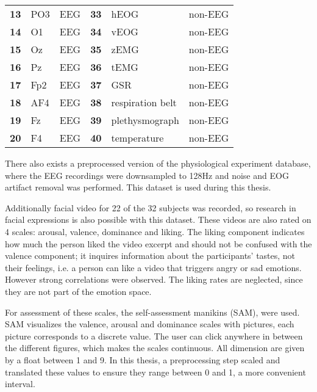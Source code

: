 \begin{table}[]
\begin{tabular}{l|ll|l|ll}
\textbf{13}      & PO3           & EEG               & \textbf{33}      & hEOG             & non-EEG           \\
\textbf{14}      & O1            & EEG               & \textbf{34}      & vEOG             & non-EEG           \\
\textbf{15}      & Oz            & EEG               & \textbf{35}      & zEMG             & non-EEG           \\
\textbf{16}      & Pz            & EEG               & \textbf{36}      & tEMG             & non-EEG           \\
\textbf{17}      & Fp2           & EEG               & \textbf{37}      & GSR              & non-EEG           \\
\textbf{18}      & AF4           & EEG               & \textbf{38}      & respiration belt & non-EEG           \\
\textbf{19}      & Fz            & EEG               & \textbf{39}      & plethysmograph   & non-EEG           \\
\textbf{20}      & F4            & EEG               & \textbf{40}      & temperature      & non-EEG          
\end{tabular}
\end{table}

\npar

There also exists a preprocessed version of the physiological experiment database, where the EEG recordings were downsampled to 128Hz and noise and EOG artifact removal was performed. This dataset is used during this thesis.

\npar

Additionally facial video for 22 of the 32 subjects was recorded, so research in facial expressions is also possible with this dataset. These videos are also rated on 4 scales: arousal, valence, dominance and liking. The liking component indicates how much the person liked the video excerpt and should not be confused with the valence component; it inquires information about the participants' tastes, not their feelings, i.e. a person can like a video that triggers angry or sad emotions. However strong correlations were observed\citep{DEAP}. The liking rates are neglected, since they are not part of the emotion space.
\npar

For assessment of these scales, the self-assessment manikins (SAM), were used\cite{DEAP}. SAM visualizes the valence, arousal and dominance scales with pictures, each picture corresponds to a discrete value. The user can click anywhere in between the different figures, which makes the scales continuous. All dimension are given by a float between 1 and 9. In this thesis, a preprocessing step scaled and translated these values to ensure they range between 0 and 1, a more convenient interval.

